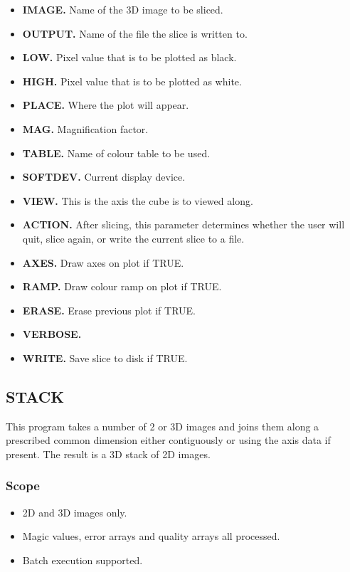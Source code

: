 \begin{itemize}
\item {\bf IMAGE.} Name of the 3D image to be sliced.
\item {\bf OUTPUT.} Name of the file the slice is written to.
\item {\bf LOW.} Pixel value that is to be plotted as black.
\item {\bf HIGH.} Pixel value that is to be plotted as white.
\item {\bf PLACE.} Where the plot will appear.
\item {\bf MAG.} Magnification factor.
\item {\bf TABLE.} Name of colour table to be used.
\item {\bf SOFTDEV.} Current display device.
\item {\bf VIEW.} This is the axis the cube is to viewed along.
\item {\bf ACTION.} After slicing, this parameter determines whether the user
will quit, slice again, or write the current slice to a file.
\item {\bf AXES.} Draw axes on plot if TRUE.
\item {\bf RAMP.} Draw colour ramp on plot if TRUE.
\item {\bf ERASE.} Erase previous plot if TRUE.
\item {\bf VERBOSE.}
\item {\bf WRITE.} Save slice to disk if TRUE.
\end {itemize}

\subsection{STACK}

This program takes a number of 2 or 3D images and joins them along a prescribed
common dimension either contiguously or using the axis data if present. The
result is a 3D stack of 2D images.

\subsubsection{Scope}

\begin{itemize}
\item 2D and 3D images only.
\item Magic values, error arrays and quality arrays all processed.
\item Batch execution supported.
\end{itemize}


